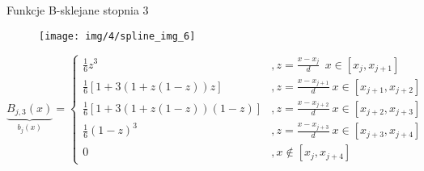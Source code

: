 \begin{frame}{Funkcje B-sklejane stopnia 3}
	\begin{figure}[h]
			\texttt{[image: img/4/spline\_img\_6]}
	\end{figure}
    \[\underbrace{B_{j,3}(x)}_{b_j(x)}=
    	\begin{cases}
    		\frac{1}{6}z^{3} &,z=\frac{x-x_{j}}{d} \ \ x \in [x_{j},x_{j+1}] \\
            \frac{1}{6}[1+3(1+z(1-z))z] &,z=\frac{x-x_{j+1}}{d} \ x 
            \in [x_{j+1},x_{j+2}]\\
            \frac{1}{6}[1+3(1+z(1-z))(1-z)] &,z=\frac{x-x_{j+2}}{d} \ x 
            \in [x_{j+2},x_{j+3}] \\
            \frac{1}{6}(1-z)^{3} &,z=\frac{x-x_{j+3}}{d} \ x 
            \in [x_{j+3},x_{j+4}] \\
            0 \ &, x \notin [x_{j},x_{j+4}]
    	\end{cases}
    \]
\end{frame}





